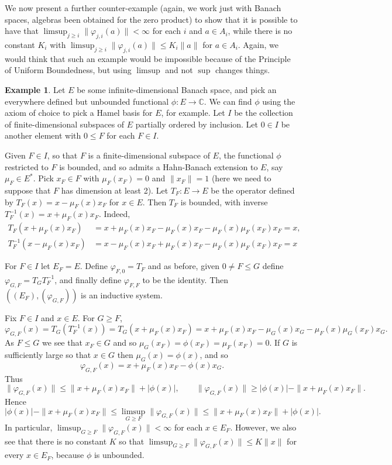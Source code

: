 \documentclass[a4paper,11pt]{article}
\theoremstyle{definition}
\newtheorem{example}[lemma]{Example}
\begin{document}
We now present a further counter-example (again, we work just with Banach spaces, algebras been
obtained for the zero product) to show that it is possible to have that
$\limsup_{j\geq i} \|\varphi_{j,i}(a)\| < \infty$ for each $i$ and $a\in A_i$, while 
there is no constant $K_i$ with $\limsup_{j\geq i} \|\varphi_{j,i}(a)\| \leq K_i\|a\|$ for
$a\in A_i$.  Again, we would think that such an example would be impossible because of the
Principle of Uniform Boundedness, but using $\limsup$ and not $\sup$ changes things.

\begin{example}\label{ex:2}
Let $E$ be some infinite-dimensional Banach space, and pick an everywhere defined but unbounded
functional $\phi:E\rightarrow\mathbb{C}$.  We can find $\phi$ using the axiom of choice to pick a
Hamel basis for $E$, for example.  Let $I$ be the collection of finite-dimensional subspaces of $E$
partially ordered by inclusion.  Let $0\in I$ be another element with $0\leq F$ for each $F\in I$.

Given $F\in I$, so that $F$ is a finite-dimensional subspace of $E$, the functional $\phi$
restricted to $F$ is bounded, and so admits a Hahn-Banach extension to $E$, say $\mu_F\in E^*$.
Pick $x_F\in F$ with $\mu_F(x_F)=0$ and $\|x_F\|=1$ (here we need to suppose that $F$ has dimension
at least 2).  Let $T_F:E\rightarrow E$ be the operator defined by $T_F(x) = x - \mu_F(x) x_F$ for
$x\in E$.  Then $T_F$ is bounded, with inverse $T_F^{-1}(x) = x + \mu_F(x)x_F$.  Indeed,
\begin{align*}
T_F( x + \mu_F(x)x_F ) &= x + \mu_F(x)x_F - \mu_F(x)x_F - \mu_F(x)\mu_F(x_F) x_F = x, \\
T_F^{-1}( x - \mu_F(x) x_F ) &= x - \mu_F(x) x_F + \mu_F(x)x_F - \mu_F(x) \mu_F(x_F)x_F = x
\end{align*}

For $F\in I$ let $E_F=E$.
Define $\varphi_{F,0} = T_F$ and as before, given $0\not=F \leq G$ define $\varphi_{G,F}
= T_G T_F^{-1}$, and finally define $\varphi_{F,F}$ to be the identity.  Then
$((E_F),(\varphi_{G,F}))$ is an inductive system.

Fix $F\in I$ and $x\in E$.  For $G\geq F$,
\[ \varphi_{G,F}(x) = T_G( T_F^{-1}(x) ) = T_G( x + \mu_F(x)x_F )
= x + \mu_F(x)x_F - \mu_G(x)x_G - \mu_F(x)\mu_G(x_F)x_G. \]
As $F\leq G$ we see that $x_F\in G$ and so $\mu_G(x_F) = \phi(x_F) = \mu_F(x_F) = 0$.
If $G$ is sufficiently large so that $x\in G$ then $\mu_G(x) = \phi(x)$, and so
\[ \varphi_{G,F}(x) = x + \mu_F(x)x_F - \phi(x)x_G. \]
Thus
\[ \|\varphi_{G,F}(x)\| \leq \|x + \mu_F(x)x_F\| + |\phi(x)|, \qquad
\|\varphi_{G,F}(x)\| \geq |\phi(x)| - \|x + \mu_F(x)x_F\|. \]
Hence
\[ |\phi(x)| - \|x + \mu_F(x)x_F\| \leq
\limsup_{G\geq F} \|\varphi_{G,F}(x)\| \leq
\|x + \mu_F(x)x_F\| + |\phi(x)|. \]
In particular, $\limsup_{G\geq F} \|\varphi_{G,F}(x)\| < \infty$ for each $x\in E_F$.
However, we also see that there is no constant $K$ so that $\limsup_{G\geq F} \|\varphi_{G,F}(x)\|
\leq K \|x\|$ for every $x\in E_F$, because $\phi$ is unbounded.
\end{example}
\end{document}
